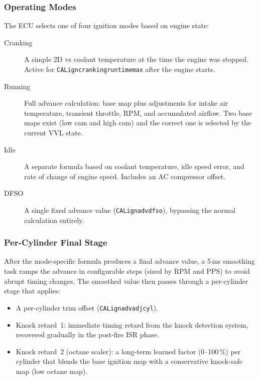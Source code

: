 \documentclass[a4paper,11pt]{article}
\renewcommand{\_}{\oldunderscore\allowbreak}
\begin{document}
\subsubsection*{Operating Modes}

The ECU selects one of four ignition modes based on engine state:

\begin{description}
	\item[Cranking] A simple 2D vs coolant temperature at the time the
	      engine was stopped. Active for
	      \texttt{CAL\_ign\_cranking\_runtime\_max} after the engine starts.
	\item[Running] Full advance calculation: base map plus adjustments for
	      intake air temperature, transient throttle, RPM, and accumulated
	      airflow. Two base maps exist (low cam and high cam) and the correct
	      one is selected by the current VVL state.
	\item[Idle] A separate formula based on coolant temperature, idle speed
	      error, and rate of change of engine speed. Includes an AC compressor
	      offset.
	\item[DFSO] A single fixed advance value (\texttt{CAL\_ign\_adv\_dfso}),
	      bypassing the normal calculation entirely.
\end{description}

\subsubsection*{Per-Cylinder Final Stage}

After the mode-specific formula produces a final advance value, a 5\,ms
smoothing task ramps the advance in configurable steps (sized by RPM and PPS)
to avoid abrupt timing changes. The smoothed value then passes through a
per-cylinder stage that applies:

\begin{itemize}
	\item A per-cylinder trim offset (\texttt{CAL\_ign\_adv\_adj\_cyl}).
	\item Knock retard~1: immediate timing retard from the knock detection
	      system, recovered gradually in the post-fire ISR phase.
	\item Knock retard~2 (octane scaler): a long-term learned factor
	      (0--100\,\%) per cylinder that blends the base ignition map with
	      a conservative knock-safe map (low octane map).
\end{itemize}
\end{document}
